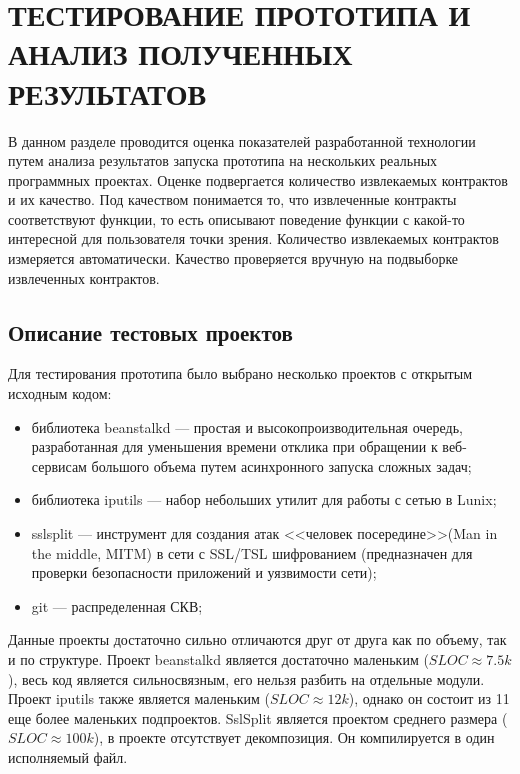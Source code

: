 \chapter{ТЕСТИРОВАНИЕ ПРОТОТИПА И АНАЛИЗ ПОЛУЧЕННЫХ РЕЗУЛЬТАТОВ}
\label{chapter:testing}
В данном разделе проводится оценка показателей разработанной технологии путем анализа результатов запуска прототипа на нескольких реальных программных проектах. Оценке подвергается количество извлекаемых контрактов и их качество. Под качеством понимается то, что извлеченные контракты соответствуют функции, то есть описывают поведение функции с какой-то интересной для пользователя точки зрения. Количество извлекаемых контрактов измеряется автоматически. Качество проверяется вручную на подвыборке извлеченных контрактов.

\section{Описание тестовых проектов}
Для тестирования прототипа было выбрано несколько проектов с открытым исходным кодом:
\begin{itemize}
\item библиотека beanstalkd --- простая и высокопроизводительная очередь, разработанная для уменьшения времени отклика при обращении к веб-сервисам большого объема путем асинхронного запуска сложных задач;
\item библиотека iputils --- набор небольших утилит для работы с сетью в Lunix;
\item sslsplit --- инструмент для создания атак <<человек посередине>>(Man in the middle, MITM) в сети с SSL/TSL шифрованием (предназначен для проверки безопасности приложений и уязвимости сети);
\item git --- распределенная СКВ;
\end{itemize}

Данные проекты достаточно сильно отличаются друг от друга как по объему, так и по структуре. Проект beanstalkd является достаточно маленьким ($SLOC \approx 7.5k$), весь код является сильносвязным, его нельзя разбить на отдельные модули. Проект iputils также является маленьким ($SLOC \approx 12k$), однако он состоит из 11 еще более маленьких подпроектов. SslSplit является проектом среднего размера ($SLOC \approx 100k$), в проекте отсутствует декомпозиция. Он компилируется в один исполняемый файл.


